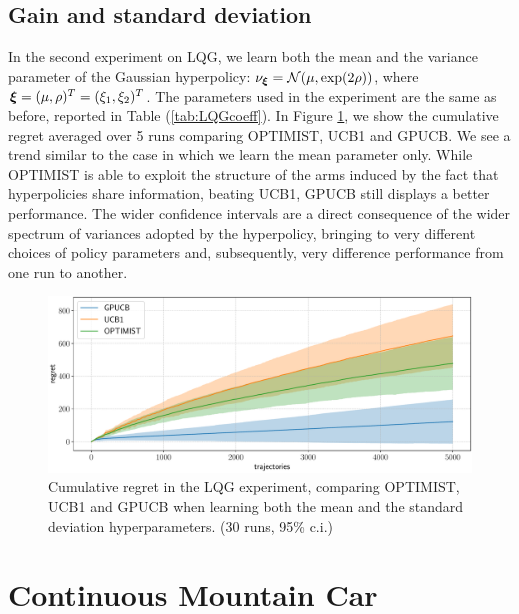 \subsection{Gain and standard deviation}
In the second experiment on \gls{LQG}, we learn both the mean and the variance parameter of the Gaussian hyperpolicy: $\nu_{\boldsymbol{\xi}} = \mathcal{N}(\mu, \exp(2\rho))$, where $\boldsymbol{\xi}=(\mu,\rho)^T=(\xi_1,\xi_2)^T$. The parameters used in the experiment are the same as before, reported in Table (\ref{tab:LQGcoeff}).
In Figure \ref{fig:LQGcomparisonVar}, we show the cumulative regret averaged over 5 runs comparing \gls{OPTIMIST}, \gls{UCB}1 and \gls{GPUCB}. We see a trend similar to the case in which we learn the mean parameter only. While \gls{OPTIMIST} is able to exploit the structure of the arms induced by the fact that hyperpolicies share information, beating \gls{UCB}1, \gls{GPUCB} still displays a better performance. The wider confidence intervals are a direct consequence of the wider spectrum of variances adopted by the hyperpolicy, bringing to very different choices of policy parameters and, subsequently, very difference performance from one run to another.

\begin{figure}[t!] 
\centering
\includegraphics[width=\textwidth,height=\textheight,keepaspectratio]{Images/LQGcomparisonVar.pdf}
\caption{Cumulative regret in
the \gls{LQG} experiment, comparing
\gls{OPTIMIST}, \gls{UCB}1 and \gls{GPUCB} when learning both the mean and the standard deviation hyperparameters.
(30 runs, 95\% c.i.)} 
\label{fig:LQGcomparisonVar} 
\end{figure}


\section{Continuous Mountain Car}

